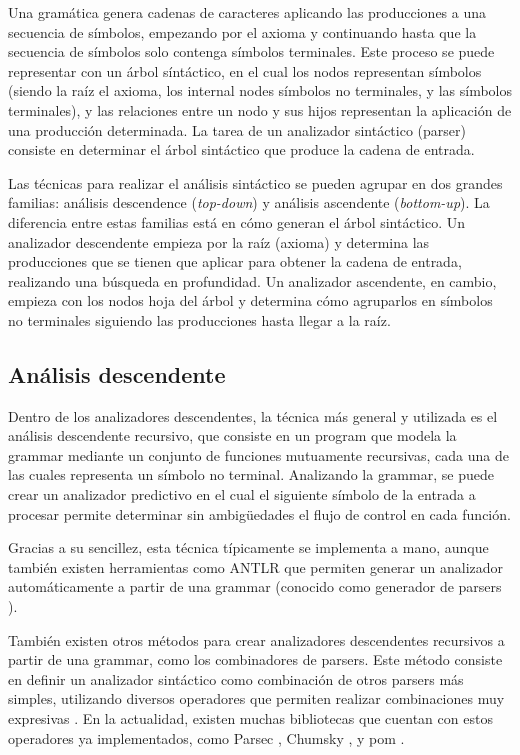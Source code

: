 Una gramática genera cadenas de caracteres aplicando las producciones a una
secuencia de símbolos, empezando por el axioma y continuando hasta que la
secuencia de símbolos solo contenga símbolos terminales. Este proceso se puede
representar con un árbol síntáctico, en el cual los nodos representan símbolos
(siendo la raíz el axioma, los \glspl{internal node} símbolos no terminales, y
las  símbolos terminales), y las relaciones entre un
nodo y sus hijos representan la aplicación de una producción determinada. La
tarea de un analizador sintáctico (\gls{parser}) consiste en determinar el árbol
sintáctico que produce la cadena de entrada. \parencite{dragon-book}

Las técnicas para realizar el análisis sintáctico se pueden agrupar en dos
grandes familias: análisis descendence (\textit{top-down}) y análisis ascendente
(\textit{bottom-up}). La diferencia entre estas familias está en cómo generan el
árbol sintáctico. Un analizador descendente empieza por la raíz (axioma) y
determina las producciones que se tienen que aplicar para obtener la cadena de
entrada, realizando una búsqueda en profundidad. Un analizador ascendente, en
cambio, empieza con los nodos hoja del árbol y determina cómo agruparlos en
símbolos no terminales siguiendo las producciones hasta llegar a la raíz.
\parencite{dragon-book}

\subsection{Análisis descendente}

Dentro de los analizadores descendentes, la técnica más general y utilizada es
el análisis descendente recursivo, que consiste en un \gls{program} que modela la
\gls{grammar} mediante un conjunto de funciones mutuamente recursivas, cada una
de las cuales representa un símbolo no terminal. Analizando la \gls{grammar}, se
puede crear un analizador predictivo en el cual el siguiente símbolo de la
entrada a procesar permite determinar sin ambigüedades el flujo de control en
cada función. \parencite{dragon-book}

Gracias a su sencillez, esta técnica típicamente se implementa a mano, aunque
también existen herramientas como ANTLR \parencite{ANTLR} que permiten generar
un analizador automáticamente a partir de una \gls{grammar} (conocido como
generador de \glspl{parser} \parencite{dragon-book}).

También existen otros métodos para crear analizadores descendentes
recursivos a partir de una \gls{grammar}, como los combinadores de
\glspl{parser}. Este método consiste en definir un analizador sintáctico como
combinación de otros \glspl{parser} más simples, utilizando diversos operadores
que permiten realizar combinaciones muy expresivas
\parencite{parser-combinators}. En la actualidad, existen muchas bibliotecas que
cuentan con estos operadores ya implementados, como Parsec \parencite{parsec}, Chumsky
\parencite{chumsky}, y pom \parencite{pom}.


